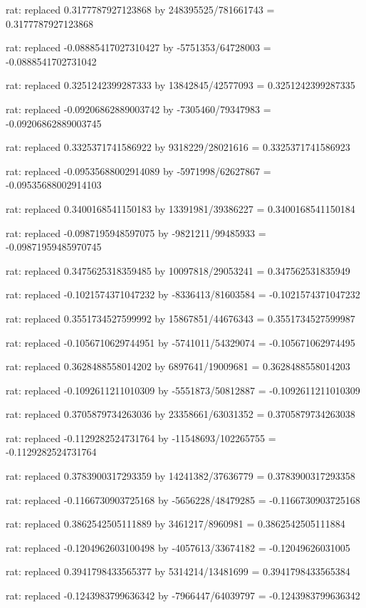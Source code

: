 \documentclass[a4paper,10pt]{article}
\begin{document}
\begin{eulernotebook}
\begin{eulercomment}
\begin{eulercomment}
\begin{eulercomment}
\begin{eulercomment}
\begin{eulercomment}
\begin{eulercomment}
\begin{eulercomment}
\begin{eulercomment}
\begin{eulercomment}
\begin{eulercomment}
\begin{eulercomment}
\begin{eulercomment}
\begin{eulercomment}
\begin{eulercomment}
\begin{eulercomment}
\begin{eulercomment}
\begin{euleroutput}
  rat: replaced 0.3177787927123868 by 248395525/781661743 = 0.3177787927123868
  
  rat: replaced -0.08885417027310427 by -5751353/64728003 = -0.0888541702731042
  
  rat: replaced 0.3251242399287333 by 13842845/42577093 = 0.3251242399287335
  
  rat: replaced -0.09206862889003742 by -7305460/79347983 = -0.09206862889003745
  
  rat: replaced 0.3325371741586922 by 9318229/28021616 = 0.3325371741586923
  
  rat: replaced -0.09535688002914089 by -5971998/62627867 = -0.09535688002914103
  
  rat: replaced 0.3400168541150183 by 13391981/39386227 = 0.3400168541150184
  
  rat: replaced -0.0987195948597075 by -9821211/99485933 = -0.09871959485970745
  
  rat: replaced 0.3475625318359485 by 10097818/29053241 = 0.347562531835949
  
  rat: replaced -0.1021574371047232 by -8336413/81603584 = -0.1021574371047232
  
  rat: replaced 0.3551734527599992 by 15867851/44676343 = 0.3551734527599987
  
  rat: replaced -0.1056710629744951 by -5741011/54329074 = -0.105671062974495
  
  rat: replaced 0.3628488558014202 by 6897641/19009681 = 0.3628488558014203
  
  rat: replaced -0.1092611211010309 by -5551873/50812887 = -0.1092611211010309
  
  rat: replaced 0.3705879734263036 by 23358661/63031352 = 0.3705879734263038
  
  rat: replaced -0.1129282524731764 by -11548693/102265755 = -0.1129282524731764
  
  rat: replaced 0.3783900317293359 by 14241382/37636779 = 0.3783900317293358
  
  rat: replaced -0.1166730903725168 by -5656228/48479285 = -0.1166730903725168
  
  rat: replaced 0.3862542505111889 by 3461217/8960981 = 0.3862542505111884
  
  rat: replaced -0.1204962603100498 by -4057613/33674182 = -0.12049626031005
  
  rat: replaced 0.3941798433565377 by 5314214/13481699 = 0.3941798433565384
  
  rat: replaced -0.1243983799636342 by -7966447/64039797 = -0.1243983799636342
  

\end{euleroutput}
\end{eulercomment}
\end{eulercomment}
\end{eulercomment}
\end{eulercomment}
\end{eulercomment}
\end{eulercomment}
\end{eulercomment}
\end{eulercomment}
\end{eulercomment}
\end{eulercomment}
\end{eulercomment}
\end{eulercomment}
\end{eulercomment}
\end{eulercomment}
\end{eulercomment}
\end{eulercomment}
\end{eulernotebook}
\end{document}
